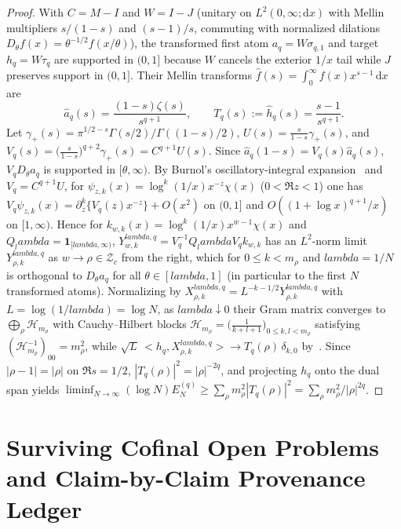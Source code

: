 \documentclass[11pt]{article}
\def\lambda{lambda}%
\def\ip#1#2{<#1,#2>}%
\theoremstyle{remark}
\newcommand{\ip}[2]{\left\langle #1,#2\right\rangle}
\newcommand{\dd}{\mathrm d}
\begin{document}
\begin{proof}
With $C = M - I$ and $W = I - J$ (unitary on $L^2(0,\infty;\dd x)$ with Mellin multipliers $s/(1-s)$ and $(s-1)/s$, commuting with normalized dilations $D_\theta f(x) = \theta^{-1/2}f(x/\theta)$), the transformed first atom $a_q = W\sigma_{q,1}$ and target $h_q = W\tau_q$ are supported in $(0,1]$ because $W$ cancels the exterior $1/x$ tail while $J$ preserves support in $(0,1]$. Their Mellin transforms $\widehat{f}(s) = \int_0^\infty f(x)x^{s-1}\,\dd x$ are
\begin{equation}\label{eq:ns83-transforms}
  \widehat{a}_q(s) = \frac{(1-s)\zeta(s)}{s^{q+1}}, \qquad T_q(s) := \widehat{h}_q(s) = \frac{s - 1}{s^{q+1}}.
\end{equation}
Let $\gamma_+(s) = \pi^{1/2-s}\Gamma(s/2)/\Gamma((1-s)/2)$, $U(s) = \frac{s}{1-s}\gamma_+(s)$, and $V_q(s) = \bigl(\frac{s}{1-s}\bigr)^{q+2}\gamma_+(s) = C^{q+1}U(s)$. Since $\widehat{a}_q(1-s) = V_q(s)\widehat{a}_q(s)$, $V_q D_\theta a_q$ is supported in $[\theta, \infty)$. By Burnol's oscillatory-integral expansion~\cite[Section~4]{BurnolLower2002} and $V_q = C^{q+1}U$, for $\psi_{z,k}(x) = \log^k(1/x)x^{-z}\chi(x)$ ($0 < \Re z < 1$) one has $V_q\psi_{z,k}(x) = \partial_z^k\{V_q(z)x^{-z}\} + O(x^2)$ on $(0,1]$ and $O((1+\log x)^{q+1}/x)$ on $[1,\infty)$. Hence for $k_{w,k}(x) = \log^k(1/x)x^{\overline{w}-1}\chi(x)$ and $Q_\lambda = \mathbf{1}_{[\lambda,\infty)}$, $Y_{w,k}^{\lambda,q} = V_q^{-1}Q_\lambda V_q k_{w,k}$ has an $L^2$-norm limit $Y_{\rho,k}^{\lambda,q}$ as $w \to \rho \in \mathcal{Z}_c$ from the right, which for $0 \le k < m_\rho$ and $\lambda = 1/N$ is orthogonal to $D_\theta a_q$ for all $\theta \in [\lambda, 1]$ (in particular to the first $N$ transformed atoms). Normalizing by $X_{\rho,k}^{\lambda,q} = L^{-k-1/2}Y_{\rho,k}^{\lambda,q}$ with $L = \log(1/\lambda) = \log N$, as $\lambda \downarrow 0$ their Gram matrix converges to $\bigoplus_\rho \mathcal{H}_{m_\rho}$ with Cauchy--Hilbert blocks $\mathcal{H}_{m_\rho} = \bigl(\frac{1}{k+l+1}\bigr)_{0 \le k,l < m_\rho}$ satisfying $(\mathcal{H}_{m_\rho}^{-1})_{00} = m_\rho^2$, while $\sqrt{L}\,\ip{h_q}{X_{\rho,k}^{\lambda,q}} \to T_q(\rho)\,\delta_{k,0}$ by~\cite[Theorem~5.4]{BurnolLower2002}. Since $|\rho - 1| = |\rho|$ on $\Re s = 1/2$, $|T_q(\rho)|^2 = |\rho|^{-2q}$, and projecting $h_q$ onto the dual span yields $\liminf_{N\to\infty}(\log N)E_N^{(q)} \ge \sum_\rho m_\rho^2|T_q(\rho)|^2 = \sum_\rho m_\rho^2/|\rho|^{2q}$.
\end{proof}

\section{Surviving Cofinal Open Problems and Claim-by-Claim Provenance Ledger}
\label{sec:open-problems}
\end{document}
